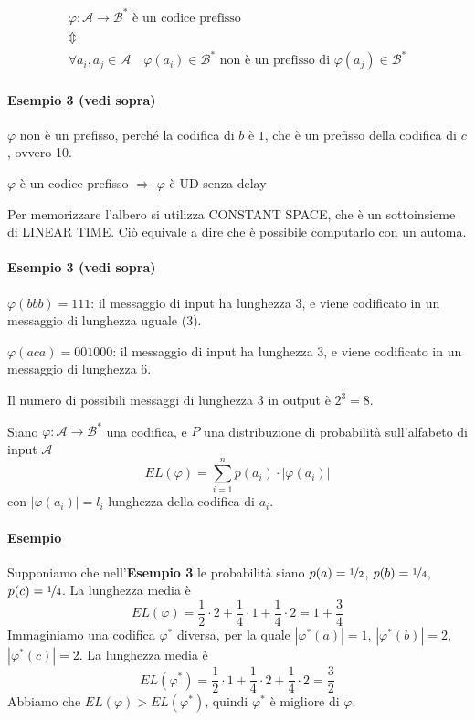 \begin{definition}
    \begin{eqnarray*}
        &\varphi : \mathcal{A} \to \mathcal{B}^* \text{ è un codice prefisso}&\\
        &\Updownarrow&\\
        &\forall a_i,a_j\in\mathcal{A} \quad \varphi(a_i)\in\mathcal{B}^*\text{ non è un prefisso di }\varphi(a_j)\in\mathcal{B}^*&
    \end{eqnarray*}
\end{definition}

\paragraph{Esempio 3 (vedi sopra)} $\varphi$ non è un prefisso, perché la codifica di $b$ è $1$, che è un prefisso della codifica di $c$, ovvero 10.

\begin{lemma}
    $\varphi$ è un codice prefisso \quad $\Rightarrow$ \quad $\varphi$ è UD senza delay
\end{lemma}
Per memorizzare l'albero si utilizza CONSTANT SPACE, che è un sottoinsieme di LINEAR TIME. Ciò equivale a dire che è possibile computarlo con un automa.

\paragraph{Esempio 3 (vedi sopra)} $\varphi(bbb)=111$: il messaggio di input ha lunghezza 3, e viene codificato in un messaggio di lunghezza uguale (3). 

$\varphi(aca)=001000$: il messaggio di input ha lunghezza 3, e viene codificato in un messaggio di lunghezza 6.

Il numero di possibili messaggi di lunghezza 3 in output è $2^3=8$.

\begin{definition}
    Siano $\varphi:\mathcal{A}\to\mathcal{B}^*$ una codifica, e $P$ una distribuzione di probabilità sull'alfabeto di input $\mathcal{A}$
    $$
        EL(\varphi) = \sum_{i=1}^n p(a_i)\cdot|\varphi(a_i)|
    $$
    con $|\varphi(a_i)|=l_i$ lunghezza della codifica di $a_i$.
\end{definition}

\paragraph{Esempio} Supponiamo che nell'\textbf{Esempio 3} le probabilità siano $p(a)=\nicefrac{1}{2}$, $p(b)=\nicefrac{1}{4}$, $p(c)=\nicefrac{1}{4}$. La lunghezza media è
$$
    EL(\varphi) = \frac{1}{2}\cdot 2 + \frac{1}{4}\cdot 1 + \frac{1}{4}\cdot 2 = 1+\frac{3}{4}
$$
Immaginiamo una codifica $\varphi^*$ diversa, per la quale $|\varphi^*(a)|=1$, $|\varphi^*(b)|=2$, $|\varphi^*(c)|=2$. La lunghezza media è
$$
    EL(\varphi^*) = \frac{1}{2}\cdot 1 + \frac{1}{4}\cdot 2 + \frac{1}{4}\cdot 2 = \frac{3}{2}
$$
Abbiamo che $EL(\varphi)>EL(\varphi^*)$, quindi $\varphi^*$ è migliore di $\varphi$.\bigskip

